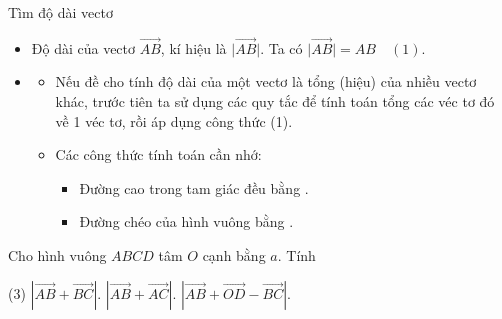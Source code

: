 \begin{dang}{Tìm độ dài vectơ}
	\begin{itemize}
		\item [\iconMT]  Độ dài của vectơ $\overrightarrow{AB}$, kí hiệu là  $\bigg|\overrightarrow{AB}\bigg|$. Ta có $\bigg|\overrightarrow{AB}\bigg|=AB \quad (1).$
		\item [\iconMT]  
		\begin{itemize}
			\item [$\bullet$] Nếu đề cho tính độ dài của một vectơ là tổng (hiệu) của nhiều vectơ khác, trước tiên ta sử dụng các quy tắc để tính toán tổng các véc tơ đó về 1 véc tơ, rồi áp dụng công thức (1).
			\item [$\bullet$] Các công thức tính toán cần nhớ:
			\begin{itemize}
				\item [*] Đường cao trong tam giác đều bằng .
				\item [*] Đường chéo của hình vuông bằng .
			\end{itemize}
		\end{itemize}
		\end{itemize}
\end{dang}

\begin{vd}
Cho hình vuông $ABCD$ tâm $O$ cạnh bằng $a$. Tính 
	\begin{tasks}(3)
		\task $\left| \overrightarrow{AB}+\overrightarrow{BC} \right|$.
		\task $\left| \overrightarrow{AB}+\overrightarrow{AC} \right|$.
		\task $\left|\vec{AB}+\vec{OD} -\vec{BC}\right|$.
	\end{tasks}
\end{vd} 

